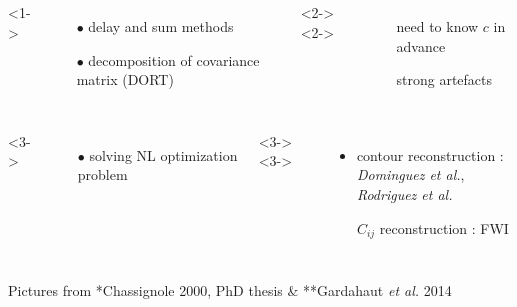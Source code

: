 \documentclass[11pt,xcolor=x11names,compress, notes=show]{beamer}%
\begin{document}
\begin{frame}{\insertsectionhead}
\begin{columns}[c]
	\end{columns}
	\vspace{0.3cm}
	\begin{columns}[c]
			<1->
				\begin{itemize}
					\item[$\bullet$] delay and sum methods
					\item[$\bullet$] decomposition of covariance matrix (DORT)
				\end{itemize}
			<2->
			<2->
				\begin{itemize}
					\item[\ding{55}] need to know $c$ in advance\\
					\item[\ding{55}] strong artefacts
				\end{itemize}
			
	\end{columns}
	\begin{columns}[c]
		<3->
			\begin{itemize}
				\item[$\bullet$] solving NL optimization problem
			\end{itemize}
		<3->
		<3->
			\begin{itemize}
			\item contour reconstruction :\\\hspace{-0.5cm}\small{\emph{Dominguez et al.}, \emph{Rodriguez et al.}}\\[0.1cm]
			\item[\ding{51}] \normalsize{$C_{ij}$ reconstruction : FWI}
		\end{itemize}		
	\end{columns}
\vfill
{\tiny Pictures from *Chassignole 2000, PhD thesis \& **Gardahaut \emph{et al.} 2014}\vspace{-0.5cm}
\end{frame} 
\end{document}

